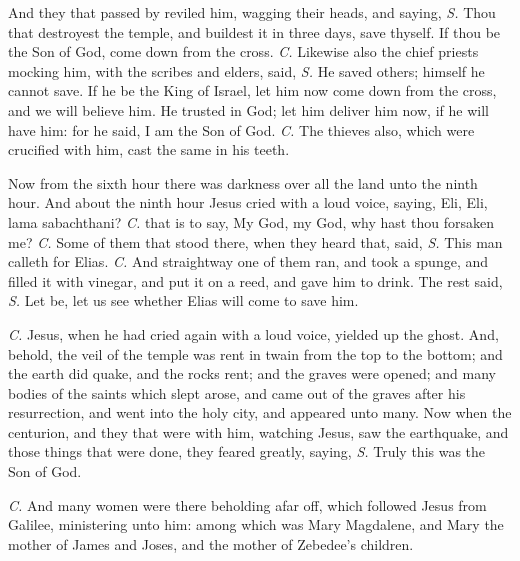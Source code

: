 And they that passed by reviled him, wagging their heads, and saying, \textit{S.} Thou that destroyest the temple, and buildest it in three days, save thyself. If thou be the Son of God, come down from the cross. \textit{C.} Likewise also the chief priests mocking him, with the scribes and elders, said, \textit{S.} He saved others; himself he cannot save. If he be the King of Israel, let him now come down from the cross, and we will believe him. He trusted in God; let him deliver him now, if he will have him: for he said, I am the Son of God. \textit{C.} The thieves also, which were crucified with him, cast the same in his teeth.

Now from the sixth hour there was darkness over all the land unto the ninth hour. And about the ninth hour Jesus cried with a loud voice, saying, {} Eli, Eli, lama sabachthani? \textit{C.} that is to say, {} My God, my God, why hast thou forsaken me? \textit{C.} Some of them that stood there, when they heard that, said, \textit{S.} This man calleth for Elias. \textit{C.} And straightway one of them ran, and took a spunge, and filled it with vinegar, and put it on a reed, and gave him to drink. The rest said, \textit{S.} Let be, let us see whether Elias will come to save him.

\textit{C.} Jesus, when he had cried again with a loud voice, yielded up the ghost.  And, behold, the veil of the temple was rent in twain from the top to the bottom; and the earth did quake, and the rocks rent; and the graves were opened; and many bodies of the saints which slept arose, and came out of the graves after his resurrection, and went into the holy city, and appeared unto many. Now when the centurion, and they that were with him, watching Jesus, saw the earthquake, and those things that were done, they feared greatly, saying, \textit{S.} Truly this was the Son of God.

\textit{C.} And many women were there beholding afar off, which followed Jesus from Galilee, ministering unto him: among which was Mary Magdalene, and Mary the mother of James and Joses, and the mother of Zebedee's children.

